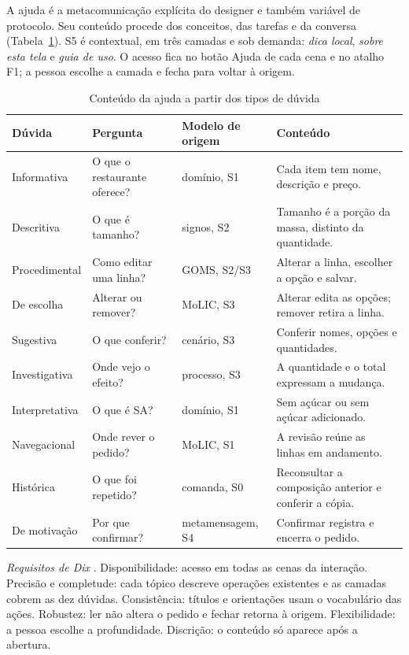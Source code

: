 A ajuda é a metacomunicação explícita do designer e também variável de protocolo. Seu conteúdo procede dos conceitos, das tarefas e da conversa \cite[pp.~39--55]{silveira} (Tabela~\ref{tab:duvidas}). S5 é contextual, em três camadas e sob demanda: \emph{dica local}, \emph{sobre esta tela} e \emph{guia de uso}. O acesso fica no botão Ajuda de cada cena e no atalho F1; a pessoa escolhe a camada e fecha para voltar à origem.
\begin{table}[!t]
\caption{Conteúdo da ajuda a partir dos tipos de dúvida}
\label{tab:duvidas}
\centering\scriptsize\setlength{\tabcolsep}{3pt}\renewcommand{\arraystretch}{1.1}
\begin{tabularx}{\textwidth}{@{}>{\raggedright\arraybackslash}p{}>{\raggedright\arraybackslash}p{}>{\raggedright\arraybackslash}p{}>{\raggedright\arraybackslash}X@{}}
\hline \textbf{Dúvida} & \textbf{Pergunta} & \textbf{Modelo de origem} & \textbf{Conteúdo}\\ \hline
Informativa & O que o restaurante oferece? & domínio, S1 & Cada item tem nome, descrição e preço.\\
Descritiva & O que é tamanho? & signos, S2 & Tamanho é a porção da massa, distinto da quantidade.\\
Procedimental & Como editar uma linha? & GOMS, S2/S3 & Alterar a linha, escolher a opção e salvar.\\
De escolha & Alterar ou remover? & MoLIC, S3 & Alterar edita as opções; remover retira a linha.\\
Sugestiva & O que conferir? & cenário, S3 & Conferir nomes, opções e quantidades.\\
Investigativa & Onde vejo o efeito? & processo, S3 & A quantidade e o total expressam a mudança.\\
Interpretativa & O que é SA? & domínio, S1 & Sem açúcar ou sem açúcar adicionado.\\
Navegacional & Onde rever o pedido? & MoLIC, S1 & A revisão reúne as linhas em andamento.\\
Histórica & O que foi repetido? & comanda, S0 & Reconsultar a composição anterior e conferir a cópia.\\
De motivação & Por que confirmar? & metamensagem, S4 & Confirmar registra e encerra o pedido.\\ \hline
\end{tabularx}
\end{table}
\par\textit{Requisitos de Dix} \cite[pp.~397--399]{dix}. Disponibilidade: acesso em todas as cenas da interação. Precisão e completude: cada tópico descreve operações existentes e as camadas cobrem as dez dúvidas. Consistência: títulos e orientações usam o vocabulário das ações. Robustez: ler não altera o pedido e fechar retorna à origem. Flexibilidade: a pessoa escolhe a profundidade. Discrição: o conteúdo só aparece após a abertura.
